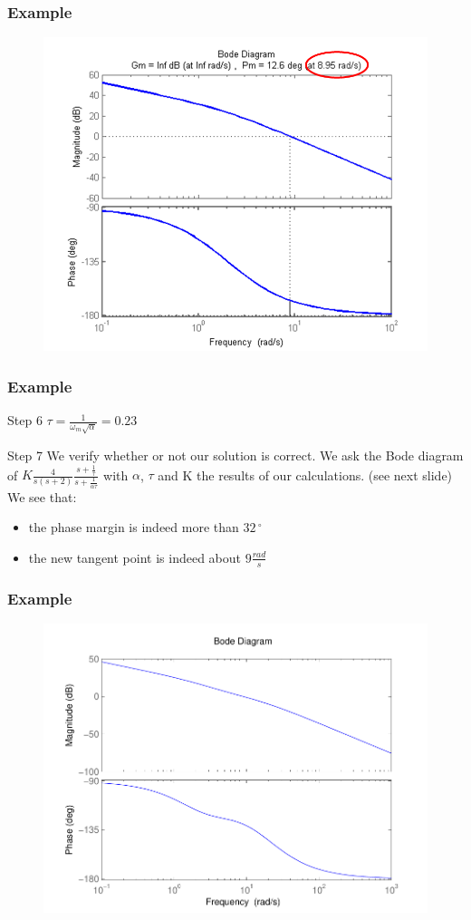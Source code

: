 \begin{frame}
	\frametitle{Example}
	\begin{figure}
		\centering
		\includegraphics[width=0.7
		\linewidth]{exampleleadstep6}
	\end{figure}
\end{frame}

\begin{frame}
	\frametitle{Example}
	\begin{block}{Step 6}
		$\tau = \frac{1}{\omega_m\sqrt{\alpha}} = 0.23$
	\end{block}
	\begin{block}{Step 7}
	We verify whether or not our solution is correct. We ask the Bode diagram of $K \frac{4}{s(s+2)} \frac{s+\frac{1}{\tau}}{s+\frac{1}{\alpha\tau}}$ with $\alpha$, $\tau$ and K the results of our calculations. (see next slide) \\
	We see that: 
	\begin{itemize}
		\item the phase margin is indeed more than $32\,^{\circ}$ 
		\item the new tangent point is indeed about $9\frac{rad}{s}$
	\end{itemize} 
	\end{block}
\end{frame}

\begin{frame}
\frametitle{Example}
\begin{figure}
	\centering
	\includegraphics[width=0.7
	\linewidth]{bodesolutionexamplelead}
\end{figure}
\end{frame}

